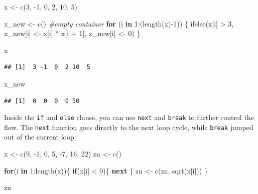 \documentclass[
]{book}
\newenvironment{Shaded}{\begin{snugshade}}{\end{snugshade}}
\newcommand{\CommentTok}[1]{\textcolor[rgb]{0.56,0.35,0.01}{\textit{#1}}}
\newcommand{\ControlFlowTok}[1]{\textcolor[rgb]{0.13,0.29,0.53}{\textbf{#1}}}
\newcommand{\DecValTok}[1]{\textcolor[rgb]{0.00,0.00,0.81}{#1}}
\newcommand{\FunctionTok}[1]{\textcolor[rgb]{0.00,0.00,0.00}{#1}}
\newcommand{\NormalTok}[1]{#1}
\newcommand{\OtherTok}[1]{\textcolor[rgb]{0.56,0.35,0.01}{#1}}
\newcommand{\SpecialCharTok}[1]{\textcolor[rgb]{0.00,0.00,0.00}{#1}}
\theoremstyle{definition}
\theoremstyle{definition}
\theoremstyle{definition}
\theoremstyle{definition}
\theoremstyle{remark}
\begin{document}
\begin{Shaded}
\begin{Highlighting}[]
\NormalTok{x }\OtherTok{\textless{}{-}} \FunctionTok{c}\NormalTok{(}\DecValTok{3}\NormalTok{, }\SpecialCharTok{{-}}\DecValTok{1}\NormalTok{, }\DecValTok{0}\NormalTok{, }\DecValTok{2}\NormalTok{, }\DecValTok{10}\NormalTok{, }\DecValTok{5}\NormalTok{)}

\NormalTok{x\_new }\OtherTok{\textless{}{-}} \FunctionTok{c}\NormalTok{() }\CommentTok{\#empty container}
\ControlFlowTok{for}\NormalTok{ (i }\ControlFlowTok{in} \DecValTok{1}\SpecialCharTok{:}\NormalTok{(}\FunctionTok{length}\NormalTok{(x)}\SpecialCharTok{{-}}\DecValTok{1}\NormalTok{)) \{}
  \FunctionTok{ifelse}\NormalTok{(x[i] }\SpecialCharTok{\textgreater{}} \DecValTok{3}\NormalTok{,  x\_new[i] }\OtherTok{\textless{}{-}}\NormalTok{ x[i] }\SpecialCharTok{*}\NormalTok{ x[i }\SpecialCharTok{+} \DecValTok{1}\NormalTok{], x\_new[i] }\OtherTok{\textless{}{-}} \DecValTok{0}\NormalTok{)  }
\NormalTok{\}}

\NormalTok{x}
\end{Highlighting}
\end{Shaded}

\begin{verbatim}
## [1]  3 -1  0  2 10  5
\end{verbatim}

\begin{Shaded}
\begin{Highlighting}[]
\NormalTok{x\_new}
\end{Highlighting}
\end{Shaded}

\begin{verbatim}
## [1]  0  0  0  0 50
\end{verbatim}

Inside the \texttt{if} and \texttt{else} clause, you can use \texttt{next} and \texttt{break} to further control the flow. The \texttt{next} function goes directly to the next loop cycle, while \texttt{break} jumped out of the current loop.

\begin{Shaded}
\begin{Highlighting}[]
\NormalTok{x }\OtherTok{\textless{}{-}} \FunctionTok{c}\NormalTok{(}\DecValTok{9}\NormalTok{, }\SpecialCharTok{{-}}\DecValTok{1}\NormalTok{, }\DecValTok{0}\NormalTok{, }\DecValTok{5}\NormalTok{, }\SpecialCharTok{{-}}\DecValTok{7}\NormalTok{, }\DecValTok{16}\NormalTok{, }\DecValTok{22}\NormalTok{)}
\NormalTok{zn }\OtherTok{\textless{}{-}} \FunctionTok{c}\NormalTok{()}

\ControlFlowTok{for}\NormalTok{(i }\ControlFlowTok{in} \DecValTok{1}\SpecialCharTok{:}\FunctionTok{length}\NormalTok{(x))\{ }
  \ControlFlowTok{if}\NormalTok{(x[i] }\SpecialCharTok{\textless{}} \DecValTok{0}\NormalTok{)\{ }
    \ControlFlowTok{next}
\NormalTok{  \} }
\NormalTok{  zn }\OtherTok{\textless{}{-}} \FunctionTok{c}\NormalTok{(zn,  }\FunctionTok{sqrt}\NormalTok{(x[i]))}
\NormalTok{\}}

\NormalTok{zn}
\end{Highlighting}
\end{Shaded}
\end{document}
